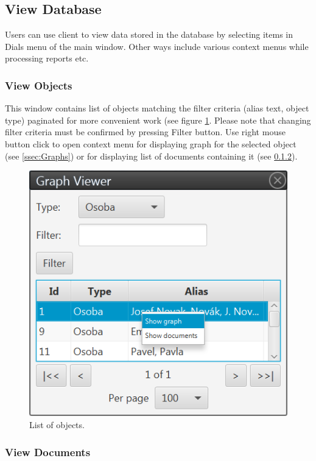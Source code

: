 \documentclass[12pt,a4paper]{report}
\begin{document}
\subsection{View Database}
\label{ssec:ViewDatabase}

Users can use client to view data stored in the database by selecting items
in Dials menu of the main window. Other ways include various context menus
while processing reports etc.

\subsubsection{View Objects}
\label{sssec:ObjectList}

This window contains list of objects matching the filter criteria (alias text,
object type) paginated for more convenient work (see figure \ref{fig:ObjectList}.
Please note that changing filter criteria must be confirmed by pressing Filter
button. Use right mouse button click to open context menu for displaying graph
for the selected object (see \ref{ssec:Graphs}) or for displaying list of documents containing it (see \ref{sssec:DocumentList}).

\begin{figure}[!htb]
        \centering
        \includegraphics{Images/objectlist}
        \caption{List of objects.}
        \label{fig:ObjectList}
\end{figure}

\subsubsection{View Documents}
\label{sssec:DocumentList}
\end{document}
